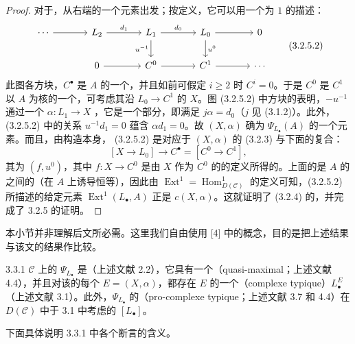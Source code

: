 \begin{proof}
对于，从右端的一个元素出发；按定义，它可以用一个为 $1$ 的描述：
\[
\begin{tikzcd}[column sep=large]
\cdots\arrow[r]&L_2\arrow[r,"d_1"]&L_1\arrow[r,"d_0"]\arrow[d,"u^{-1}"']&L_0\arrow[r]\arrow[d,"u^0"]&0\\
&0\arrow[r]&C^0\arrow[r]&C^1\arrow[r]&\cdots
\end{tikzcd}\tag{3.2.5.2}
\]
此图各方块，$C^\bullet$ 是 $A$ 的一个，并且如前可假定 $i\geq2$ 时 $C^i=0$。于是 $C^0$ 是 $C^1$ 以 $A$ 为核的一个，可考虑其沿 $L_0\to C^1$ 的 $X$。图 (3.2.5.2) 中方块的表明，$-u^{-1}$ 通过一个 $\alpha:L_1\to X$ ，它是一个部分，即满足 $j\alpha=d_0$（$j$ 见 (3.1.2)）。此外，(3.2.5.2) 中的关系 $u^{-1}d_1=0$ 蕴含 $\alpha d_1=0$。故 $(X,\alpha)$ 确为 $\Psi_{L_\bullet}(A)$ 的一个元素。而且，由构造本身， (3.2.5.2) 是对应于 $(X,\alpha)$ 的 (3.2.3) 与下面的复合：
\[
[X\longrightarrow L_0]\longrightarrow C^\bullet=[C^0\longrightarrow C^1],
\]
其为 $(f,u^0)$，其中 $f:X\to C^0$ 是由 $X$ 作为 $C^0$ 的的定义所得的。上面的是 $A$ 的之间的（在 $A$ 上诱导恒等），因此由 $\operatorname{Ext}^1=\operatorname{Hom}^1_{D(\mathcal C)}$ 的定义可知，(3.2.5.2) 所描述的给定元素 $\operatorname{Ext}^1(L_\bullet,A)$ 正是 $c(X,\alpha)$。这就证明了 (3.2.4) 的，并完成了 3.2.5 的证明。
\end{proof}

本小节并非理解后文所必需。这里我们自由使用 [4] 中的概念，目的是把上述结果与该文的结果作比较。

\begin{SGAresult}{}{3.3.1}
$\mathcal C$ 上的 $\Psi_{L_\bullet}$ 是（上述文献 2.2），它具有一个（quasi-maximal；上述文献 4.4），并且对该的每个 $E=(X,\alpha)$，都存在 $E$ 的一个（complexe typique）$L^E_\bullet$（上述文献 3.1）。此外，$\Psi_{L_\bullet}$ 的（pro-complexe typique；上述文献 3.7 和 4.4）在 $D(\mathcal C)$ 中于 3.1 中考虑的 $[L_\bullet]$。
\end{SGAresult}
下面具体说明 3.3.1 中各个断言的含义。

